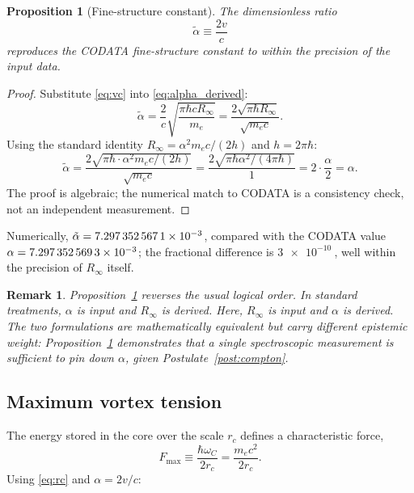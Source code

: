 \documentclass[aps,pra,preprint,longbibliography,nofootinbib]{revtex4-2}
\newtheorem{proposition}{Proposition}
\newtheorem{remark}{Remark}
\newcommand{\vc}{v}              %
\newcommand{\rc}{r_c}            %
\newcommand{\omC}{\omega_C}      %
\newcommand{\Rinf}{R_\infty}     %
\newcommand{\Fmax}{F_{\max}}     %
\begin{document}
\begin{proposition}[Fine-structure constant]
\label{prop:alpha}
The dimensionless ratio
\begin{equation}
  \tilde\alpha \equiv \frac{2\vc}{c}
  \label{eq:alpha_derived}
\end{equation}
reproduces the CODATA fine-structure constant to within the precision
of the input data.
\end{proposition}

\begin{proof}
Substitute \eqref{eq:vc} into \eqref{eq:alpha_derived}:
\begin{equation}
  \tilde\alpha = \frac{2}{c}\sqrt{\frac{\pi\hbar c\Rinf}{m_e}}
  = \frac{2\sqrt{\pi\hbar\Rinf}}{\sqrt{m_e c}}.
\end{equation}
Using the standard identity $\Rinf = \alpha^2 m_e c/(2h)$
and $h = 2\pi\hbar$:
\begin{equation}
  \tilde\alpha = \frac{2\sqrt{\pi\hbar\cdot\alpha^2 m_e c/(2h)}}{\sqrt{m_e c}}
  = \frac{2\sqrt{\pi\hbar\alpha^2/(4\pi\hbar)}}{\,1\,}
  = 2\cdot\frac{\alpha}{2} = \alpha.
\end{equation}
The proof is algebraic; the numerical match to CODATA is a consistency
check, not an independent measurement.
\end{proof}

Numerically, $\tilde\alpha = \num{7.297\,352\,567\,1e-3}$, compared
with the CODATA value
$\alpha = \num{7.297\,352\,569\,3e-3}$;
the fractional difference is $\SI{3e-10}{}$, well within the
precision of $\Rinf$ itself.

\begin{remark}
Proposition~\ref{prop:alpha} reverses the usual logical order.
In standard treatments, $\alpha$ is input and $\Rinf$ is derived.
Here, $\Rinf$ is input and $\alpha$ is derived.
The two formulations are mathematically equivalent but carry different
epistemic weight: Proposition~\ref{prop:alpha} demonstrates that
a single spectroscopic measurement is sufficient to pin down $\alpha$,
given Postulate~\ref{post:compton}.
\end{remark}

\subsection{Maximum vortex tension}
\label{sec:Fmax}

The energy stored in the core over the scale $\rc$ defines a
characteristic force,
\begin{equation}
  \Fmax \equiv \frac{\hbar\omC}{2\rc}
              = \frac{m_e c^2}{2\rc}.
  \label{eq:Fmax_def}
\end{equation}
Using \eqref{eq:rc} and $\alpha = 2\vc/c$:
\end{document}
